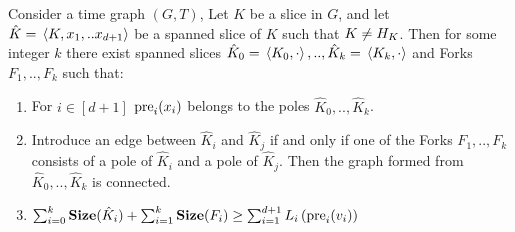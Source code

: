   \begin{claim}
    \label{claim:prevslices}
    Consider a time graph $(G,T)$, Let $K$ be a slice in $G$, and let $\hat{K} = \expval*{K, x_{1}, .. x_{d+1}}$ be a spanned slice of $K$ such that $K \neq H_{K}$. Then for some integer $k$ there exist spanned slices $\hat{K}_{0} = \expval*{K_{0}, \cdot}, ..,\hat{K}_{k}=\expval*{K_{k}, \cdot }$ and Forks $F_{1},..,F_{k}$ such that:
    \begin{enumerate}
      \item For $i \in [d+1]$ $ \text{pre}_{i}(x_{i}) $ belongs to the poles $\hat{K}_{0},..,\hat{K}_{k}$.  
      \item Introduce an edge between $\hat{K}_{i}$ and $\hat{K}_{j}$ if and only if one of the Forks $F_{1},..,F_{k}$ consists of a pole of $\hat{K}_{i}$ and a pole of $\hat{K}_{j}$. Then the graph formed from $\hat{K}_{0},..,\hat{K}_{k}$ is connected.  
      \item $\sum_{i=0}^{k}\mathbf{Size}(\hat{K}_{i}) +  \sum^{k}_{i=1}\mathbf{Size}(F_{i}) \ge \sum_{i=1}^{d+1}L_{i}\left( \text{pre}_{i}(v_{i}) \right) $
    \end{enumerate}
  \end{claim}
